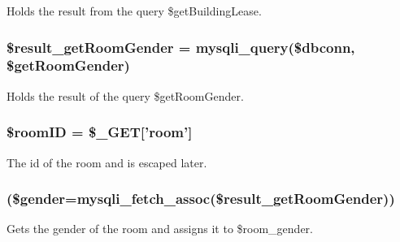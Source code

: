 \-Holds the result from the query \$get\-Building\-Lease. \hypertarget{getRoomInfo_8php_a9ce0616f2a54ee7e19e22d0bb7c4c1c7}{
\subsubsection[{\$result\-\_\-get\-Room\-Gender}]{\setlength{\rightskip}{0pt plus 5cm}\$result\-\_\-get\-Room\-Gender = mysqli\-\_\-query(\$dbconn, \$get\-Room\-Gender)}}\label{getRoomInfo_8php_a9ce0616f2a54ee7e19e22d0bb7c4c1c7}
\-Holds the result of the query \$get\-Room\-Gender. \hypertarget{getRoomInfo_8php_a61034568ba6e795a925d00afa98d3797}{
\subsubsection[{\$room\-I\-D}]{\setlength{\rightskip}{0pt plus 5cm}\$room\-I\-D = \$\-\_\-\-G\-E\-T\mbox{[}'room'\mbox{]}}}\label{getRoomInfo_8php_a61034568ba6e795a925d00afa98d3797}
\-The id of the room and is escaped later. \hypertarget{getRoomInfo_8php_a47624afeb833a11e7095ab00ea7bd2ea}{
\subsubsection[{while}]{(\$gender=mysqli\-\_\-fetch\-\_\-assoc(\$result\-\_\-get\-Room\-Gender))}}\label{getRoomInfo_8php_a47624afeb833a11e7095ab00ea7bd2ea}
\-Gets the gender of the room and assigns it to \$room\-\_\-gender. 